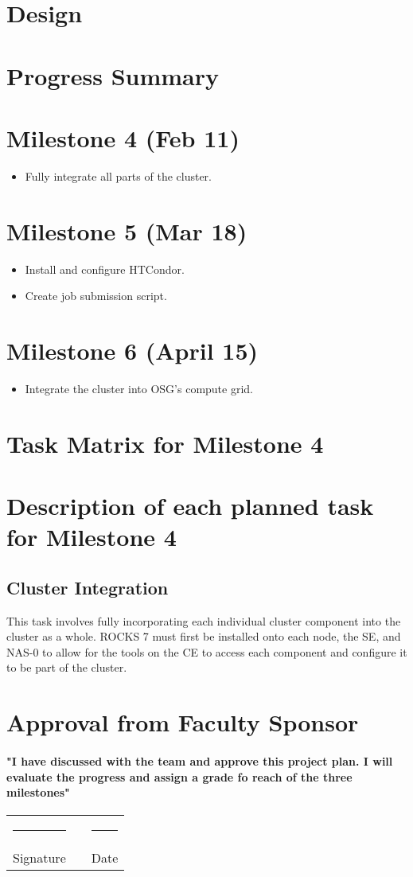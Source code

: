\documentclass[12pt]{article}
\newcommand\tab[1][1cm]{\hspace*{#1}}
\newcommand{\doubleSignature}[2]{
	\begin{center}
		
	\end{center}
	\vspace{2cm}
	
	\noindent
	\begin{tabular}{lcl}
		\rule{7cm}{1pt} & \hspace{2cm} & \rule{3cm}{1pt} \\
		#1 & & #2
	\end{tabular}
	\vspace{1cm}
}
\begin{document}
\section{Design}

\section{Progress Summary}

\section{Milestone 4 (Feb 11)}
\begin{itemize}
  \item Fully integrate all parts of the cluster.
\end{itemize}

\section{Milestone 5 (Mar 18)}
\begin{itemize}
  \item Install and configure HTCondor.
  \item Create job submission script.
\end{itemize}

\section{Milestone 6 (April 15)}
\begin{itemize}
  \item Integrate the cluster into OSG's compute grid.
\end{itemize}

\section{Task Matrix for Milestone 4}

\section{Description of each planned task for Milestone 4}

\subsection{Cluster Integration}
This task involves fully incorporating each individual cluster component into
the cluster as a whole. ROCKS 7 must first be installed onto each node, the SE,
and NAS-0 to allow for the tools on the CE to access each component and
configure it to be part of the cluster.

\section{Approval from Faculty Sponsor}
\paragraph{\tab "I have discussed with the team and approve this project plan. I will evaluate the progress and assign a grade fo reach of the three milestones"}
\doubleSignature{Signature}{Date}
\end{document}
